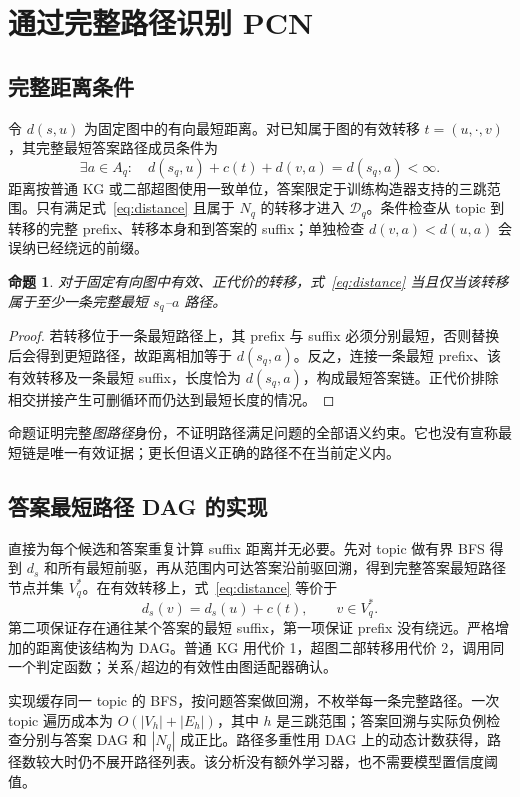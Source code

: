 \documentclass[UTF8,a4paper,10pt,fontset=fandol]{ctexart}
\newtheorem{proposition}{命题}
\newcommand{\pcn}{\mathcal D_q}
\begin{document}
\section{通过完整路径识别 PCN}
\subsection{完整距离条件}
令 $d(s,u)$ 为固定图中的有向最短距离。对已知属于图的有效转移 $t=(u,\cdot,v)$，其完整最短答案路径成员条件为
\begin{equation}
\exists a\in A_q:\quad d(s_q,u)+c(t)+d(v,a)=d(s_q,a)<\infty.
\label{eq:distance}
\end{equation}
距离按普通 KG 或二部超图使用一致单位，答案限定于训练构造器支持的三跳范围。只有满足式~\eqref{eq:distance} 且属于 $N_q$ 的转移才进入 $\pcn$。条件检查从 topic 到转移的完整 prefix、转移本身和到答案的 suffix；单独检查 $d(v,a)<d(u,a)$ 会误纳已经绕远的前缀。

\begin{proposition}
对于固定有向图中有效、正代价的转移，式~\eqref{eq:distance} 当且仅当该转移属于至少一条完整最短 $s_q$--$a$ 路径。
\end{proposition}
\begin{proof}
若转移位于一条最短路径上，其 prefix 与 suffix 必须分别最短，否则替换后会得到更短路径，故距离相加等于 $d(s_q,a)$。反之，连接一条最短 prefix、该有效转移及一条最短 suffix，长度恰为 $d(s_q,a)$，构成最短答案链。正代价排除相交拼接产生可删循环而仍达到最短长度的情况。
\end{proof}

命题证明完整\emph{图路径}身份，不证明路径满足问题的全部语义约束。它也没有宣称最短链是唯一有效证据；更长但语义正确的路径不在当前定义内。

\subsection{答案最短路径 DAG 的实现}
直接为每个候选和答案重复计算 suffix 距离并无必要。先对 topic 做有界 BFS 得到 $d_s$ 和所有最短前驱，再从范围内可达答案沿前驱回溯，得到完整答案最短路径节点并集 $V_q^*$。在有效转移上，式~\eqref{eq:distance} 等价于
\begin{equation}
d_s(v)=d_s(u)+c(t),\qquad v\in V_q^*.
\label{eq:dag}
\end{equation}
第二项保证存在通往某个答案的最短 suffix，第一项保证 prefix 没有绕远。严格增加的距离使该结构为 DAG。普通 KG 用代价 1，超图二部转移用代价 2，调用同一个判定函数；关系/超边的有效性由图适配器确认。

实现缓存同一 topic 的 BFS，按问题答案做回溯，不枚举每一条完整路径。一次 topic 遍历成本为 $O(|V_h|+|E_h|)$，其中 $h$ 是三跳范围；答案回溯与实际负例检查分别与答案 DAG 和 $|N_q|$ 成正比。路径多重性用 DAG 上的动态计数获得，路径数较大时仍不展开路径列表。该分析没有额外学习器，也不需要模型置信度阈值。
\end{document}
